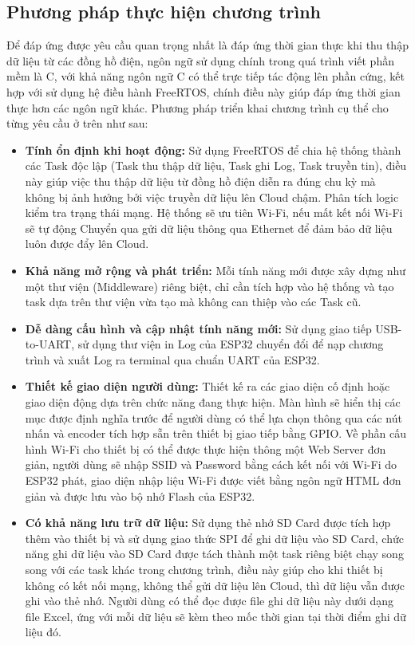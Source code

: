 \subsection{Phương pháp thực hiện chương trình}
Để đáp ứng được yêu cầu quan trọng nhất là đáp ứng thời gian thực khi thu thập dữ liệu từ các đồng hồ điện, ngôn ngữ sử dụng 
chính trong quá trình viết phần mềm là C, với khả năng ngôn ngữ C có thể trực tiếp tác động lên phần cứng, kết hợp với sử dụng
hệ điều hành FreeRTOS, chính điều này giúp đáp ứng thời gian thực hơn các ngôn ngữ khác. 
Phương pháp triển khai chương trình
cụ thể cho từng yêu cầu ở trên như sau:
\begin{itemize}
    \item \textbf{Tính ổn định khi hoạt động:} Sử dụng FreeRTOS để chia hệ thống thành các Task độc lập (Task thu thập dữ liệu, 
    Task ghi Log, Task truyền tin), điều này giúp việc thu thập dữ liệu từ đồng hồ điện diễn ra đúng chu kỳ mà không bị ảnh 
    hưởng bởi việc truyền dữ liệu lên Cloud chậm. Phân tích logic kiểm tra trạng thái mạng. Hệ thống sẽ ưu tiên Wi-Fi, nếu mất 
    kết nối Wi-Fi sẽ tự động Chuyển qua gửi dữ liệu thông qua Ethernet để đảm bảo dữ liệu luôn được đẩy lên Cloud.
    
    \item \textbf{Khả năng mở rộng và phát triển:} Mỗi tính năng mới được xây dựng như một thư viện (Middleware) riêng biệt, 
    chỉ cần tích hợp vào hệ thống và tạo task dựa trên thư viện vừa tạo mà không can thiệp vào các Task cũ.

    \item \textbf{Dễ dàng cấu hình và cập nhật tính năng mới:} Sử dụng giao tiếp USB-to-UART, sử dụng thư viện in Log của ESP32  
    chuyển đổi để nạp chương trình và xuất Log ra terminal qua chuẩn UART của ESP32.  
    
    \item \textbf{Thiết kế giao diện người dùng:} Thiết kế ra các giao diện cố định hoặc giao diện động dựa trên chức năng đang
    thực hiện. Màn hình sẽ hiển thị các mục được định nghĩa trước để người dùng có thể lựa chọn thông qua các nút nhấn và encoder
    tích hợp sẵn trên thiết bị giao tiếp bằng GPIO. Về phần cấu hình Wi-Fi cho thiết bị có thể được thực hiện thông một Web Server 
    đơn giản, người dùng sẽ nhập SSID và Password bằng cách kết nối với Wi-Fi do ESP32 phát, giao diện nhập liệu Wi-Fi được viết 
    bằng ngôn ngữ HTML đơn giản và được lưu vào bộ nhớ Flash của ESP32.

    \item \textbf{Có khả năng lưu trữ dữ liệu:} Sử dụng thẻ nhớ SD Card được tích hợp thêm vào thiết bị và sử dụng giao thức SPI để
    ghi dữ liệu vào SD Card, chức năng ghi dữ liệu vào SD Card được tách thành một task riêng biệt chạy song song với các task khác 
    trong chương trình, điều này giúp cho khi thiết bị không có kết nối mạng, không thể gửi dữ liệu lên Cloud, thì dữ liệu vẫn được
    ghi vào thẻ nhớ. Người dùng có thể đọc được file ghi dữ liệu này dưới dạng file Excel, ứng với mỗi dữ liệu sẽ kèm theo mốc thời
    gian tại thời điểm ghi dữ liệu đó.
\end{itemize}

